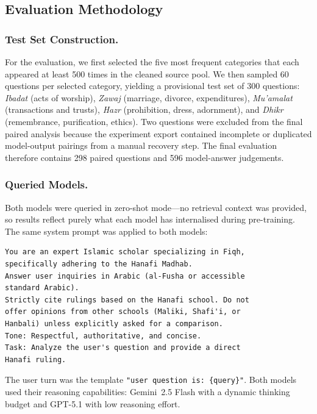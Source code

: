 \documentclass[runningheads]{llncs}
\begin{document}
\subsection{Evaluation Methodology}

\subsubsection{Test Set Construction.}
For the evaluation, we first selected the five most frequent categories that each appeared at least 500 times in the cleaned source pool. We then sampled 60 questions per selected category, yielding a provisional test set of 300 questions:
\textit{Ibadat} (acts of worship), \textit{Zawaj} (marriage, divorce, expenditures), \textit{Mu'amalat} (transactions and trusts), \textit{Hazr} (prohibition, dress, adornment), and \textit{Dhikr} (remembrance, purification, ethics).
Two questions were excluded from the final paired analysis because the experiment export contained incomplete or duplicated model-output pairings from a manual recovery step. The final evaluation therefore contains 298 paired questions and 596 model-answer judgements.

\subsubsection{Queried Models.}
Both models were queried in zero-shot mode---no retrieval context was provided, so results reflect purely what each model has internalised during pre-training. The same system prompt was applied to both models:

\begin{lstlisting}
You are an expert Islamic scholar specializing in Fiqh,
specifically adhering to the Hanafi Madhab.
Answer user inquiries in Arabic (al-Fusha or accessible
standard Arabic).
Strictly cite rulings based on the Hanafi school. Do not
offer opinions from other schools (Maliki, Shafi'i, or
Hanbali) unless explicitly asked for a comparison.
Tone: Respectful, authoritative, and concise.
Task: Analyze the user's question and provide a direct
Hanafi ruling.
\end{lstlisting}

The user turn was the template \texttt{"user~question~is:~\{query\}"}. Both models used their reasoning capabilities: Gemini~2.5 Flash with a dynamic thinking budget and GPT-5.1 with low reasoning effort.
\end{document}
